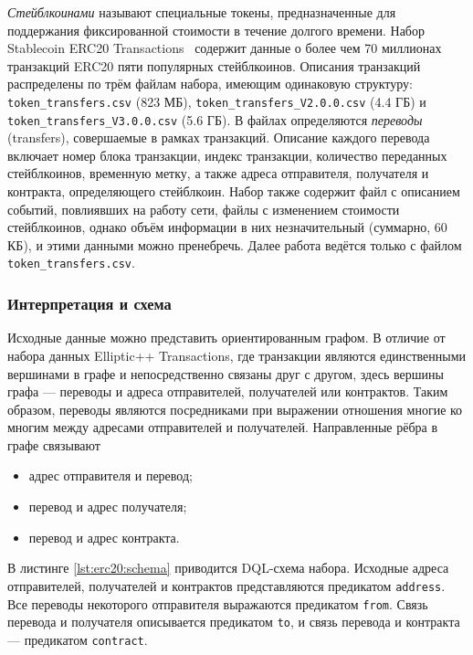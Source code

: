 \textit{Стейблкоинами} называют специальные токены, предназначенные для поддержания фиксированной стоимости в течение
долгого времени. Набор Stablecoin ERC20 Transactions~\cite{erc20} содержит данные о более чем 70 миллионах транзакций ERC20
пяти популярных стейблкоинов. Описания транзакций распределены по трём файлам набора, имеющим одинаковую структуру:
\texttt{token\_transfers.csv} (823 МБ), \texttt{token\_transfers\_V2.0.0.csv} (4.4 ГБ)
и \texttt{token\_transfers\_V3.0.0.csv} (5.6 ГБ). В файлах определяются \textit{переводы} (transfers), совершаемые в
рамках транзакций. Описание каждого перевода включает номер блока транзакции, индекс транзакции, количество
переданных стейблкоинов, временную метку, а также адреса отправителя, получателя и контракта, определяющего стейблкоин.
Набор также содержит файл с описанием событий, повлиявших на работу сети, файлы с изменением стоимости стейблкоинов,
однако объём информации в них незначительный (суммарно, 60 КБ), и этими данными можно пренебречь. Далее работа ведётся
только с файлом \texttt{token\_transfers.csv}.

\subsubsection{Интерпретация и схема}

Исходные данные можно представить ориентированным графом. В отличие от набора данных Elliptic++ Transactions, где транзакции
являются единственными вершинами в графе и непосредственно связаны друг с другом, здесь вершины графа ---
переводы и адреса отправителей, получателей или контрактов. Таким образом, переводы являются посредниками при
выражении отношения многие ко многим между адресами отправителей и получателей. Направленные рёбра в графе связывают
\begin{itemize}
    \item адрес отправителя и перевод;
    \item перевод и адрес получателя;
    \item перевод и адрес контракта.
\end{itemize}
В листинге \ref{lst:erc20:schema} приводится DQL-схема набора. Исходные адреса отправителей, получателей и контрактов
представляются предикатом \texttt{address}. Все переводы некоторого отправителя выражаются предикатом \texttt{from}. Связь
перевода и получателя описывается предикатом \texttt{to}, и связь перевода и контракта --- предикатом \texttt{contract}.


